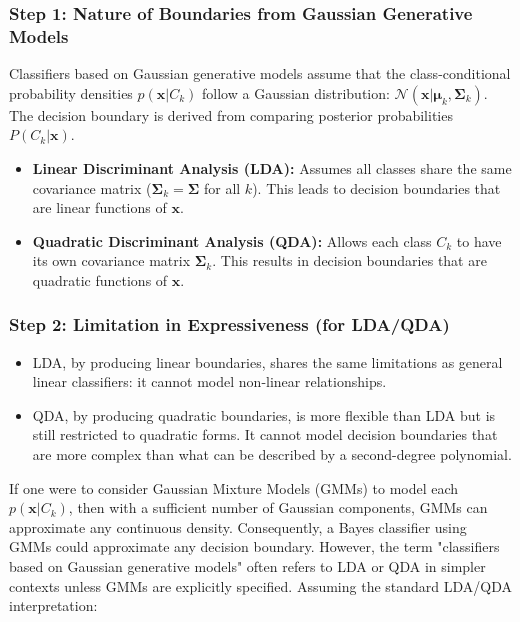 \documentclass{article}
\begin{document}
\subsubsection*{Step 1: Nature of Boundaries from Gaussian Generative Models}
\parbox{\textwidth}{
Classifiers based on Gaussian generative models assume that the class-conditional probability densities $p(\mathbf{x}|C_k)$ follow a Gaussian distribution: $\mathcal{N}(\mathbf{x} | \boldsymbol{\mu}_k, \boldsymbol{\Sigma}_k)$. The decision boundary is derived from comparing posterior probabilities $P(C_k|\mathbf{x})$.
\begin{itemize}
    \item \textbf{Linear Discriminant Analysis (LDA):} Assumes all classes share the same covariance matrix ($\boldsymbol{\Sigma}_k = \boldsymbol{\Sigma}$ for all $k$). This leads to decision boundaries that are linear functions of $\mathbf{x}$.
    \item \textbf{Quadratic Discriminant Analysis (QDA):} Allows each class $C_k$ to have its own covariance matrix $\boldsymbol{\Sigma}_k$. This results in decision boundaries that are quadratic functions of $\mathbf{x}$.
\end{itemize}
}

\subsubsection*{Step 2: Limitation in Expressiveness (for LDA/QDA)}
\parbox{\textwidth}{
\begin{itemize}
    \item LDA, by producing linear boundaries, shares the same limitations as general linear classifiers: it cannot model non-linear relationships.
    \item QDA, by producing quadratic boundaries, is more flexible than LDA but is still restricted to quadratic forms. It cannot model decision boundaries that are more complex than what can be described by a second-degree polynomial.
\end{itemize}
If one were to consider Gaussian Mixture Models (GMMs) to model each $p(\mathbf{x}|C_k)$, then with a sufficient number of Gaussian components, GMMs can approximate any continuous density. Consequently, a Bayes classifier using GMMs could approximate any decision boundary. However, the term "classifiers based on Gaussian generative models" often refers to LDA or QDA in simpler contexts unless GMMs are explicitly specified. Assuming the standard LDA/QDA interpretation:
}
\end{document}
